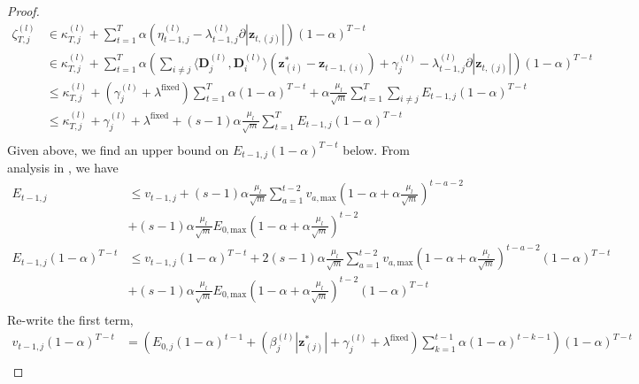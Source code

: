 \documentclass[10pt]{article} %
\newcommand{\D}{{\bm D}}
\newcommand{\z}{{\bm z}}
\begin{document}
\begin{proof}
\begin{equation}
\begin{aligned}
\zeta _{T,j}^{(l)} &\in \kappa_{T,j}^{(l)} + \sum_{t=1}^T \alpha  (\eta_{t-1,j}^{(l)} - \lambda_{t-1,j}^{(l)} \partial | \z_{t, (j)} |) (1 - \alpha)^{T-t}\\
&\in \kappa_{T,j}^{(l)} + \sum_{t=1}^T \alpha  (\sum_{i \neq j} \langle \D_j^{(l)}, \D_i^{(l)} \rangle (\z^{\ast}_{(i)} - \z_{t-1, (i)}) + \gamma_j^{(l)} - \lambda_{t-1,j}^{(l)} \partial | \z_{t, (j)} |) (1 - \alpha)^{T-t}\\
&\leq \kappa_{T,j}^{(l)} + (\gamma_j^{(l)} + \lambda^{\text{fixed}}) \sum_{t=1}^T \alpha (1 - \alpha)^{T-t}  + \alpha \frac{\mu_l}{\sqrt{m}}\sum_{t=1}^T \sum_{i \neq j} E_{t-1,j} (1 - \alpha)^{T-t}\\
&\leq \kappa_{T,j}^{(l)} + \gamma_j^{(l)} + \lambda^{\text{fixed}} + (s-1) \alpha \frac{\mu_l}{\sqrt{m}}\sum_{t=1}^T  E_{t-1,j} (1 - \alpha)^{T-t}\\
\end{aligned}
\end{equation}
Given above, we find an upper bound on $E_{t-1,j} (1 - \alpha)^{T-t}$ below. From analysis in , we have
\begin{equation}
\begin{aligned}
E_{t-1, j} &\leq v_{t-1, j} + (s-1) \alpha \frac{\mu_l}{\sqrt{m}} \sum_{a=1}^{t-2} v_{a, \text{max}} (1 - \alpha + \alpha \frac{\mu_l}{\sqrt{m}})^{t - a - 2}\\
&+ (s-1) \alpha \frac{\mu_l}{\sqrt{m}} E_{0, \text{max}} (1 - \alpha + \alpha \frac{\mu_l}{\sqrt{m}})^{t-2}\\
E_{t-1, j} (1 - \alpha)^{T-t} &\leq v_{t-1, j} (1 - \alpha)^{T-t} + 2 (s-1) \alpha \frac{\mu_l}{\sqrt{m}} \sum_{a=1}^{t-2} v_{a, \text{max}} (1 - \alpha + \alpha \frac{\mu_l}{\sqrt{m}})^{t - a - 2} (1 - \alpha)^{T-t}\\
&+ (s-1) \alpha \frac{\mu_l}{\sqrt{m}} E_{0, \text{max}} (1 - \alpha + \alpha \frac{\mu_l}{\sqrt{m}})^{t-2} (1 - \alpha)^{T-t}\\
\end{aligned}
\end{equation}
Re-write the first term,
\begin{equation}
\begin{aligned}
v_{t-1, j} (1 - \alpha)^{T-t} &= (E_{0, j} (1 - \alpha)^{t-1} + (\beta_j^{(l)} | \z^{\ast}_{(j)} | + \gamma_j^{(l)} + \lambda^{\text{fixed}}) \sum_{k=1}^{t-1} \alpha (1 - \alpha)^{t-k-1}) (1 - \alpha)^{T-t}\\

\end{aligned}
\end{equation}
\end{proof}
\end{document}
